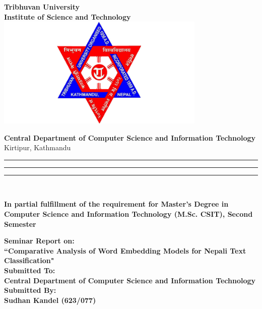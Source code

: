 \documentclass[a4paper, 12pt]{report}
\begin{document}
 

\begin{titlepage}
\begin{center}
\textbf{\LARGE Tribhuvan University}\\[0.5cm] 
\textbf{\large Institute of Science and Technology}\\[0.2cm]
\vspace{20pt}\includegraphics[width=10cm]{images/Logo.png}\\
\par
\vspace{15pt}
  \textbf{\Large Central Department of Computer Science and Information Technology}\\
  Kirtipur, Kathmandu\\
\vspace{15pt}  
\centering
\rule[10pt]{1.5pt}{60pt}
\rule[0pt]{1.5pt}{80pt}
\rule[10pt]{1.5pt}{60pt}\\
\begin{center}
\textbf{In partial fulfillment of the requirement for Master’s Degree in Computer Science and Information Technology (M.Sc. CSIT), Second Semester}\\
\end{center}
\textbf{\LARGE  Seminar Report on:}\\ [0.2cm]

\textbf{\large “Comparative Analysis of Word Embedding Models for Nepali Text Classification"}\\
\vspace{15pt} 
\textbf {\large Submitted To:}\\[0.2cm]
\textbf {Central Department of Computer Science and Information Technology}\\[0.1cm]
\vspace{15pt}  
\textbf {\large Submitted By:}\\[0.2cm]
\textbf{Sudhan Kandel (623/077)}\\[0.1cm]
\end{center}
\par
\vfill

\end{titlepage}
\end{document}
